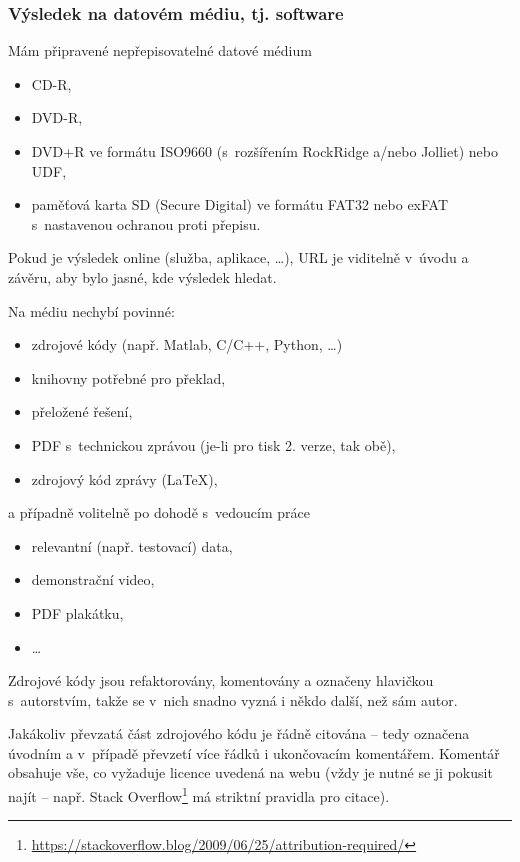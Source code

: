 \subsubsection*{Výsledek na datovém médiu, tj. software}
\begin{checklist}
	\item Mám připravené nepřepisovatelné datové médium 
      \begin{itemize}
	  		\item CD-R,
            \item DVD-R,
            \item DVD+R ve formátu ISO9660 (s~rozšířením RockRidge a/nebo Jolliet) nebo UDF,
            \item paměťová karta SD (Secure Digital) ve formátu FAT32 nebo exFAT s~nastavenou ochranou proti přepisu.
      \end{itemize}
	\item Pokud je výsledek online (služba, aplikace, \dots), URL je viditelně v~úvodu a závěru, aby bylo jasné, kde výsledek hledat.
	\item Na médiu nechybí povinné: 
    	\begin{itemize}
    		\item zdrojové kódy (např. Matlab, C/C++, Python, \dots)
            \item knihovny potřebné pro překlad,
            \item přeložené řešení,
            \item PDF s~technickou zprávou (je-li pro tisk 2. verze, tak obě),
            \item zdrojový kód zprávy (\LaTeX), 
    	\end{itemize}
        a případně volitelně po dohodě s~vedoucím práce
		\begin{itemize}
			\item relevantní (např. testovací) data, 
            \item demonstrační video,
            \item PDF plakátku,
            \item \dots
		\end{itemize}        
	\item Zdrojové kódy jsou refaktorovány, komentovány a označeny hlavičkou s~autorstvím, takže se v~nich snadno vyzná i někdo další, než sám autor.
    \item Jakákoliv převzatá část zdrojového kódu je řádně citována -- tedy označena úvodním a v~případě převzetí více řádků i ukončovacím komentářem. Komentář obsahuje vše, co vyžaduje licence uvedená na webu (vždy je nutné se ji pokusit najít -- např. Stack Overflow\footnote{\url{https://stackoverflow.blog/2009/06/25/attribution-required/}} má striktní pravidla pro citace).
\end{checklist}

